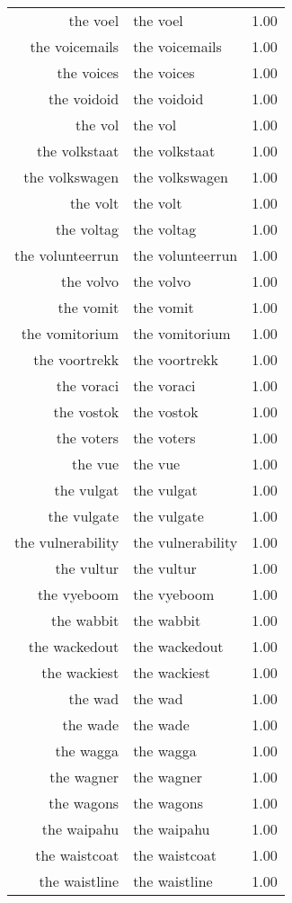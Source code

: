 \begin{table}[ht]
\begin{tabular}{rlr}
  the voel & the voel & 1.00 \\ 
  the voicemails & the voicemails & 1.00 \\ 
  the voices & the voices & 1.00 \\ 
  the voidoid & the voidoid & 1.00 \\ 
  the vol & the vol & 1.00 \\ 
  the volkstaat & the volkstaat & 1.00 \\ 
  the volkswagen & the volkswagen & 1.00 \\ 
  the volt & the volt & 1.00 \\ 
  the voltag & the voltag & 1.00 \\ 
  the volunteerrun & the volunteerrun & 1.00 \\ 
  the volvo & the volvo & 1.00 \\ 
  the vomit & the vomit & 1.00 \\ 
  the vomitorium & the vomitorium & 1.00 \\ 
  the voortrekk & the voortrekk & 1.00 \\ 
  the voraci & the voraci & 1.00 \\ 
  the vostok & the vostok & 1.00 \\ 
  the voters & the voters & 1.00 \\ 
  the vue & the vue & 1.00 \\ 
  the vulgat & the vulgat & 1.00 \\ 
  the vulgate & the vulgate & 1.00 \\ 
  the vulnerability & the vulnerability & 1.00 \\ 
  the vultur & the vultur & 1.00 \\ 
  the vyeboom & the vyeboom & 1.00 \\ 
  the wabbit & the wabbit & 1.00 \\ 
  the wackedout & the wackedout & 1.00 \\ 
  the wackiest & the wackiest & 1.00 \\ 
  the wad & the wad & 1.00 \\ 
  the wade & the wade & 1.00 \\ 
  the wagga & the wagga & 1.00 \\ 
  the wagner & the wagner & 1.00 \\ 
  the wagons & the wagons & 1.00 \\ 
  the waipahu & the waipahu & 1.00 \\ 
  the waistcoat & the waistcoat & 1.00 \\ 
  the waistline & the waistline & 1.00 \\ 

\end{tabular}
\end{table}
